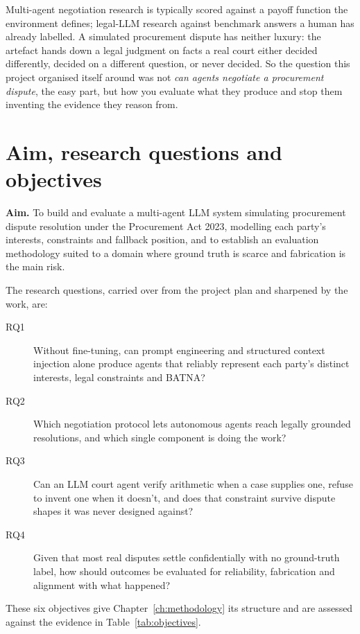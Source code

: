 Multi-agent negotiation research is typically scored against a payoff
function the environment defines; legal-LLM research against benchmark
answers a human has already labelled. A simulated procurement dispute has
neither luxury: the artefact hands down a legal judgment on facts a real
court either decided differently, decided on a different question, or
never decided. So the question this project organised itself around was
not \emph{can agents negotiate a procurement dispute}, the easy part, but
how you evaluate what they produce and stop them inventing the evidence
they reason from.

\section{Aim, research questions and objectives}
\label{sec:objectives}

\textbf{Aim.} To build and evaluate a multi-agent LLM system simulating
procurement dispute resolution under the Procurement Act 2023, modelling
each party's interests, constraints and fallback position, and to
establish an evaluation methodology suited to a domain where ground truth
is scarce and fabrication is the main risk.

The research questions, carried over from the project plan and sharpened
by the work, are:

\begin{description}
 \item[RQ1] Without fine-tuning, can prompt engineering and structured context
 injection alone produce agents that reliably represent each party's distinct
 interests, legal constraints and BATNA?
 \item[RQ2] Which negotiation protocol lets autonomous agents reach legally
 grounded resolutions, and which single component is doing the work?
 \item[RQ3] Can an LLM court agent verify arithmetic when a case supplies one,
 refuse to invent one when it doesn't, and does that constraint survive
 dispute shapes it was never designed against?
 \item[RQ4] Given that most real disputes settle confidentially with no
 ground-truth label, how should outcomes be evaluated for reliability,
 fabrication and alignment with what happened?
\end{description}

These six objectives give Chapter~\ref{ch:methodology} its structure and
are assessed against the evidence in Table~\ref{tab:objectives}.

